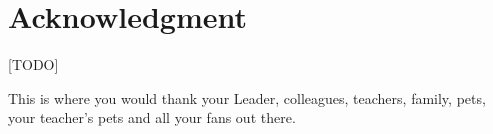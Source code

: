 \chapter*{Acknowledgment}

[TODO]


This is where you would thank your Leader, colleagues, teachers,
family, pets, your teacher's pets and all your fans out there.

